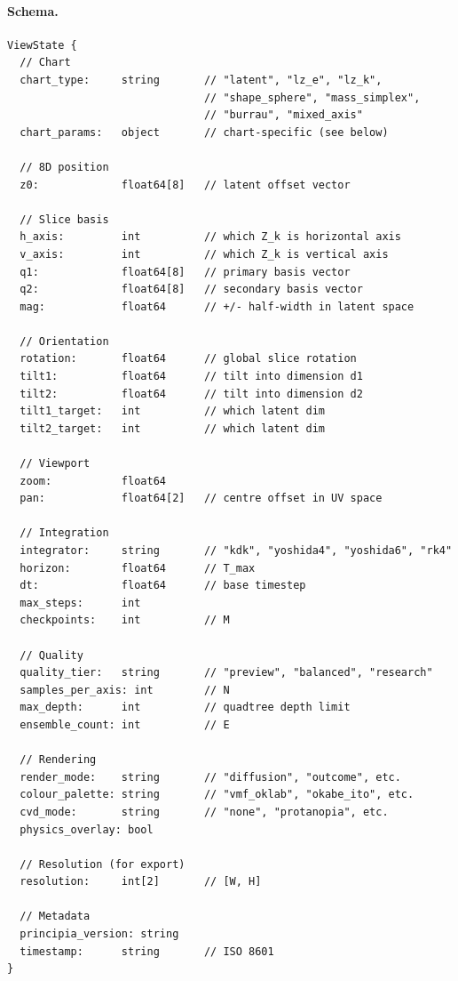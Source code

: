 \documentclass[11pt]{report}
\begin{document}
\paragraph{Schema.}
\begin{verbatim}
ViewState {
  // Chart
  chart_type:     string       // "latent", "lz_e", "lz_k",
                               // "shape_sphere", "mass_simplex",
                               // "burrau", "mixed_axis"
  chart_params:   object       // chart-specific (see below)

  // 8D position
  z0:             float64[8]   // latent offset vector

  // Slice basis
  h_axis:         int          // which Z_k is horizontal axis
  v_axis:         int          // which Z_k is vertical axis
  q1:             float64[8]   // primary basis vector
  q2:             float64[8]   // secondary basis vector
  mag:            float64      // +/- half-width in latent space

  // Orientation
  rotation:       float64      // global slice rotation
  tilt1:          float64      // tilt into dimension d1
  tilt2:          float64      // tilt into dimension d2
  tilt1_target:   int          // which latent dim
  tilt2_target:   int          // which latent dim

  // Viewport
  zoom:           float64
  pan:            float64[2]   // centre offset in UV space

  // Integration
  integrator:     string       // "kdk", "yoshida4", "yoshida6", "rk4"
  horizon:        float64      // T_max
  dt:             float64      // base timestep
  max_steps:      int
  checkpoints:    int          // M

  // Quality
  quality_tier:   string       // "preview", "balanced", "research"
  samples_per_axis: int        // N
  max_depth:      int          // quadtree depth limit
  ensemble_count: int          // E

  // Rendering
  render_mode:    string       // "diffusion", "outcome", etc.
  colour_palette: string       // "vmf_oklab", "okabe_ito", etc.
  cvd_mode:       string       // "none", "protanopia", etc.
  physics_overlay: bool

  // Resolution (for export)
  resolution:     int[2]       // [W, H]

  // Metadata
  principia_version: string
  timestamp:      string       // ISO 8601
}
\end{verbatim}
\end{document}
